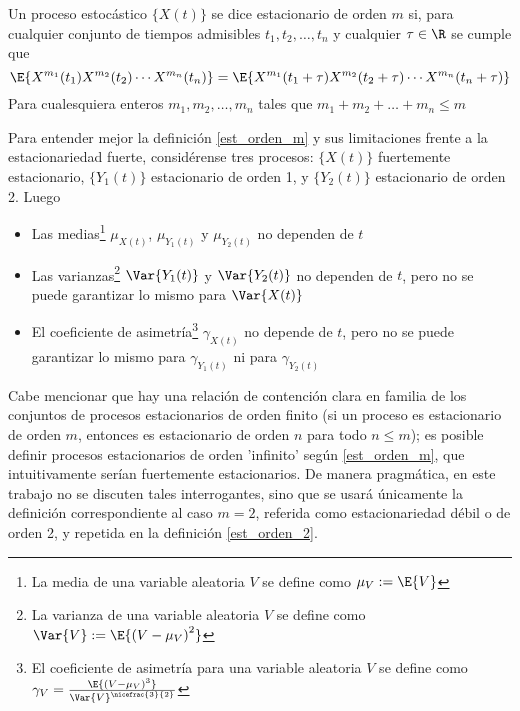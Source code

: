 \begin{defn}
Un proceso estoc\'astico $\{ X(t) \}$ se dice estacionario de orden $m$ si, para cualquier conjunto 
de tiempos admisibles $t_1,t_2,\dots,t_n$ y cualquier $\tau \in \R$ se cumple que
\begin{equation*}
\E{ X^{m_1}(t_1)X^{m_2}(t_2)\cdots X^{m_n}(t_n) }
=
\E{ X^{m_1}(t_1+\tau)X^{m_2}(t_2+\tau)\cdots X^{m_n}(t_n+\tau) }
\end{equation*}
Para cualesquiera enteros $m_1,m_2,\dots,m_n$ tales que $m_1+m_2+\dots+m_n \leq m$
\label{est_orden_m}
\end{defn}

Para entender mejor la definici\'on \ref{est_orden_m} y sus limitaciones frente a la 
estacionariedad fuerte, consid\'erense tres procesos: $\{X(t)\}$ fuertemente estacionario, 
$\{Y_1(t)\}$ estacionario de orden 1, y $\{Y_2(t)\}$ estacionario de orden 2. Luego
\begin{itemize}
\item Las medias\footnote{La media de una variable aleatoria $V$ se define como $ \mu_V := \E{V}$} 
$ \mu_{X(t)}$, $ \mu_{Y_1(t)}$ y $ \mu_{Y_2(t)}$ no dependen de $t$

\item Las varianzas\footnote{La varianza de una variable aleatoria $V$ se define como 
$ \Var{V} := \E{\left(V - \mu_V \right)^{2}}$} $ \Var{Y_1(t)}$ y $ \Var{Y_2(t)}$ no dependen de 
$t$, pero no se puede garantizar lo mismo para $\Var{X(t)}$

\item El coeficiente de asimetr\'ia\footnote{El coeficiente de asimetr\'ia para una variable 
aleatoria $V$ se define como 
$\gamma_V = \frac{\E{\left(V-\mu_V\right)^{3}}}{\Var{V}^{\nicefrac{3}{2}}}$}
$ \gamma_{X(t)}$ no depende de $t$, pero no se puede garantizar lo mismo para $ \gamma_{Y_1(t)}$ ni 
para $ \gamma_{Y_2(t)}$
\end{itemize}

Cabe mencionar que hay una relaci\'on de contenci\'on clara en familia de los conjuntos de procesos 
estacionarios de orden finito (si un proceso es estacionario de orden $m$, entonces es estacionario 
de orden $n$ para todo $n \leq m$); es posible definir procesos estacionarios de orden 'infinito' 
seg\'un \ref{est_orden_m}, que intuitivamente ser\'ian fuertemente estacionarios. 
De manera pragm\'atica, en este trabajo no se discuten tales interrogantes, sino que se usar\'a 
\'unicamente la definici\'on correspondiente al caso $m=2$, referida como estacionariedad d\'ebil o 
de orden 2, y repetida en la definici\'on \ref{est_orden_2}.



